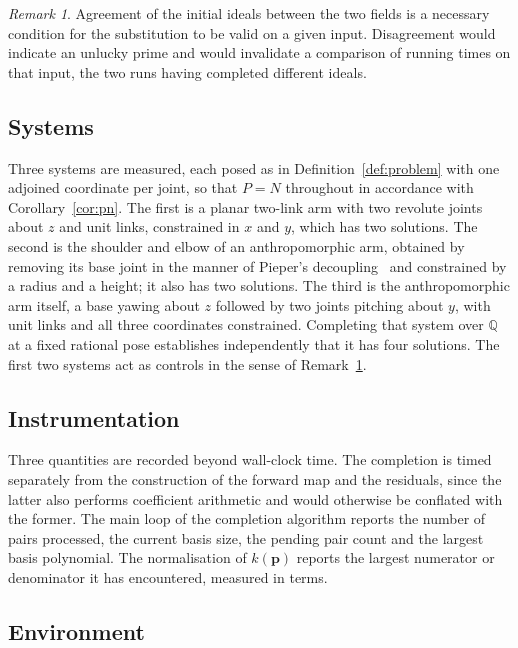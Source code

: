 \documentclass[11pt,a4paper]{article}
\theoremstyle{plain}
\theoremstyle{definition}
\theoremstyle{remark}
\newtheorem{remark}[proposition]{Remark}
\newcommand{\QQ}{\mathbb{Q}}
\newcommand{\bp}{\boldsymbol{p}}
\begin{document}
\begin{remark}
\label{rem:control}
Agreement of the initial ideals between the two fields is a necessary condition for the substitution
to be valid on a given input. Disagreement would indicate an unlucky prime and would invalidate a
comparison of running times on that input, the two runs having completed different ideals.
\end{remark}

\subsection{Systems}

Three systems are measured, each posed as in Definition~\ref{def:problem} with one adjoined coordinate
per joint, so that $P = N$ throughout in accordance with Corollary~\ref{cor:pn}. The first is a planar
two-link arm with two revolute joints about $z$ and unit links, constrained in $x$ and $y$, which has
two solutions. The second is the shoulder and elbow of an anthropomorphic arm, obtained by removing
its base joint in the manner of Pieper's decoupling~\cite{pieper1968} and constrained by a radius and
a height; it also has two solutions. The third is the anthropomorphic arm itself, a base yawing about
$z$ followed by two joints pitching about $y$, with unit links and all three coordinates constrained.
Completing that system over $\QQ$ at a fixed rational pose establishes independently that it has four
solutions. The first two systems act as controls in the sense of Remark~\ref{rem:control}.

\subsection{Instrumentation}

Three quantities are recorded beyond wall-clock time. The completion is timed separately from the
construction of the forward map and the residuals, since the latter also performs coefficient
arithmetic and would otherwise be conflated with the former. The main loop of the completion algorithm
reports the number of pairs processed, the current basis size, the pending pair count and the largest
basis polynomial. The normalisation of $k(\bp)$ reports the largest numerator or denominator it has
encountered, measured in terms.

\subsection{Environment}
\end{document}
